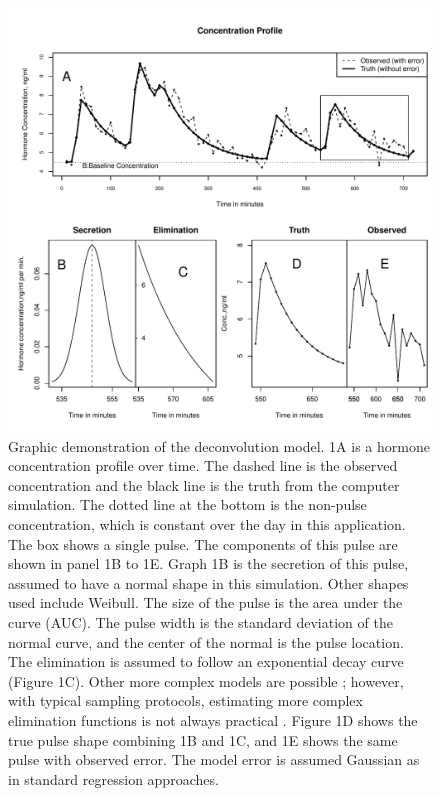 \documentclass[11pt]{book}
\begin{document}
\begin{figure}[!h]
    \begin{center}
        \includegraphics[width=5in]{deconvolution.pdf}
    \end{center}
   \caption{Graphic demonstration of the deconvolution model. 1A is a hormone concentration profile over time. The dashed line is the observed concentration and the black line is the truth from the computer simulation. The dotted line at the bottom is the non-pulse concentration, which is constant over the day in this application. The box shows a single pulse. The components of this pulse are shown in panel 1B to 1E. Graph 1B is the secretion of this pulse, assumed to have a normal shape in this simulation. Other shapes used include Weibull. The size of the pulse is the area under the curve (AUC). The pulse width is the standard deviation of the normal curve, and the center of the normal is the pulse location. The elimination is assumed to follow an exponential decay curve (Figure 1C).  Other more complex models are possible \cite{Keenan08}; however, with typical sampling protocols, estimating more complex elimination functions is not always practical \cite{Mauger95}. Figure 1D shows the true pulse shape combining 1B and 1C, and 1E shows the same pulse with observed error. The model error is assumed Gaussian as in standard regression approaches.
}
   \label{fig:deconv}
\end{figure}
\end{document}
